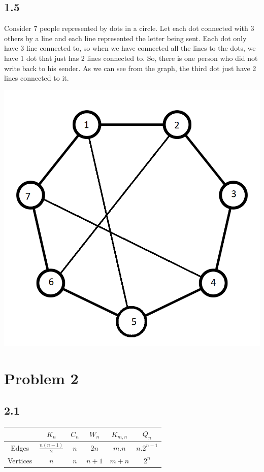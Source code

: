 \documentclass{article}
\begin{document}
\subsection*{1.5}
Consider 7 people represented by dots in a circle. Let each dot connected with 3 others by a line and each line represented the letter being sent. Each dot only have 3 line connected to, so when we have connected all the lines to the dots, we have 1 dot that just has 2 lines connected to. So, there is one person who did not write back to his sender.
As we can see from the graph, the third dot just have 2 lines connected to it.
\begin{center}
    \includegraphics[scale = 0.4]{problem_1/graph2.png}
\end{center}
\bigskip
\section*{Problem 2 }
\subsection*{2.1}
\begin{table}[h]
\centering
\begin{tabular}{|c|c|c|c|c|c|}
\hline
         & $K_{n}$ & $C_{n}$ & $W_{n}$ & $K_{m, n}$ & $Q_{n}$ \\ \hline
Edges & $ \frac{n(n - 1)}{2} $ & $ n $ & $ 2n $ & $ m.n $ & $ n.2^{n - 1} $  \\ \hline
Vertices    & $ n $ & $ n $ & $ n + 1 $ & $ m + n $ & $ 2^n $  \\ \hline
\end{tabular}
\end{table}
\end{document}
